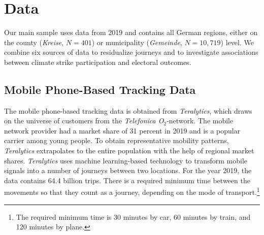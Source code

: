 \restoregeometry


















\newpage
\section{Data}\label{sec_greta_cons:data} 
Our main sample uses data from 2019 and contains all German regions, either on the county (\textit{Kreise}, $N=401$) or municipality (\textit{Gemeinde}, $N=10,719$) level. We combine six sources of data to residualize journeys and to investigate associations between climate strike participation and electoral outcomes.




\subsection{Mobile Phone-Based Tracking Data}
The mobile phone-based tracking data is obtained from \textit{Teralytics}, which draws on the universe of customers from the \textit{Telefonica O$_2$}-network. The mobile network provider had a market share of 31 percent in 2019 \citep{statista2020marktanteil} and is a popular carrier among young people. To obtain representative mobility patterns, \textit{Teralytics} extrapolates to the entire population with the help of regional market shares. \textit{Teralytics} uses machine learning-based technology to transform mobile signals into a number of journeys between two locations. For the year 2019, the data contains 64.4 billion trips. There is a required minimum time between the movements so that they count as a journey, depending on the mode of transport.\footnote{The required minimum time is 30 minutes by car, 60 minutes by train, and 120 minutes by plane.} 

